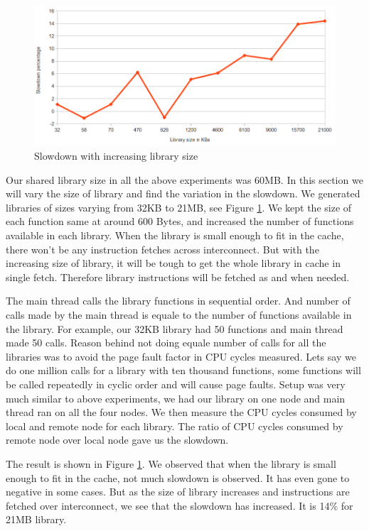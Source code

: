 \begin{figure}
    \centering
    \includegraphics[scale=0.37]{slowdownWithSize.png}
    \caption{Slowdown with increasing library size }
    \label{fig:slowdownWithSize.png}
\end{figure}

Our shared library size in all the above experiments was 60MB.
In this section we will vary the size of library and find the variation in the slowdown.
We generated libraries of sizes varying from 32KB to 21MB, see Figure \ref{fig:slowdownWithSize.png}.
We kept the size of each function same at around 600 Bytes, and increased the number of functions available in each library.
When the library is small enough to fit in the cache, there won't be any instruction fetches across interconnect.
But with the increasing size of library, it will be tough to get the whole library in cache in single fetch.
Therefore library instructions will be fetched as and when needed.

The main thread calls the library functions in sequential order.
And number of calls made by the main thread is equale to the number of functions available in the library.
For example, our 32KB library had 50 functions and main thread made 50 calls.
Reason behind not doing equale number of calls for all the libraries was to avoid the page fault factor in CPU cycles measured.
Lets say we do one million calls for a library with ten thousand functions, some functions will be called repeatedly in cyclic order and will cause page faults.
Setup was very much similar to above experiments, we had our library on one node and main thread ran on all the four nodes.
We then measure the CPU cycles consumed by local and remote node for each library.
The ratio of CPU cycles consumed by remote node over local node gave us the slowdown.

The result is shown in Figure \ref{fig:slowdownWithSize.png}.
We observed that when the library is small enough to fit in the cache, not much slowdown is observed.
It has even gone to negative in some cases.
But as the size of library increases and instructions are fetched over interconnect, we see that the slowdown has increased.
It is 14\% for 21MB library.
